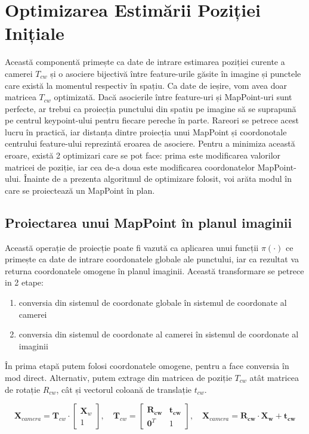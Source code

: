 \documentclass[12pt,a4paper]{report}
\begin{document}
\section{Optimizarea Estimării Poziției Inițiale}
Această componentă primește ca date de intrare estimarea poziției curente a camerei
\(T_{cw}\) și o asociere bijectivă între feature-urile găsite în imagine și punctele 
care există la momentul respectiv în spațiu. Ca date de ieșire, vom avea doar matricea 
\(T_{cw}\) optimizată. Dacă asocierile între feature-uri și MapPoint-uri
sunt perfecte, ar trebui ca proiecția punctului din spatiu pe imagine să se suprapună pe 
centrul keypoint-ului pentru fiecare pereche în parte. Rareori se petrece acest lucru în practică, iar distanța dintre
proiecția unui MapPoint și coordonotale centrului feature-ului reprezintă eroarea de 
asociere. Pentru a minimiza această eroare, există 2 optimizari care se pot face:
prima este modificarea valorilor matricei de poziție, iar cea de-a doua este modificarea 
coordonatelor MapPoint-ului. Înainte de a prezenta algoritmul de optimizare
folosit, voi arăta modul în care se proiectează un MapPoint în plan.
\subsection{Proiectarea unui MapPoint în planul imaginii}
Această operație de proiecție poate fi vazută ca aplicarea unui funcții $ \pi(\cdot) $
ce primește ca date de intrare coordonatele globale ale punctului, iar ca rezultat va
returna coordonatele omogene în planul imaginii. Această transformare se petrece in 
2 etape:
\begin{enumerate}
    \item conversia din sistemul de coordonate globale în sistemul de coordonate al camerei
    \item conversia din sistemul de coordonate al camerei în sistemul de coordonate al imaginii
\end{enumerate}
În prima etapă putem folosi coordonatele omogene, pentru a face conversia în mod direct.
Alternativ, putem extrage din matricea de poziție \(T_{cw}\) atât matricea de 
rotație \(R_{cw}\), cât și vectorul coloană de translație \(t_{cw}\).

\begin{equation}
\mathbf{X}_{camera} = \mathbf{T}_{cw} \cdot 
\begin{bmatrix}
\mathbf{X}_w \\
1
\end{bmatrix}, \quad
\mathbf{T}_{cw} =
\begin{bmatrix}
\mathbf{R_{cw}} & \mathbf{t_{cw}} \\
\mathbf{0}^T & 1
\end{bmatrix}, \quad
\mathbf{X}_{camera} = \mathbf{R_{cw}} \cdot \mathbf{X_w} + \mathbf{t_{cw}}
\end{equation}
\end{document}

